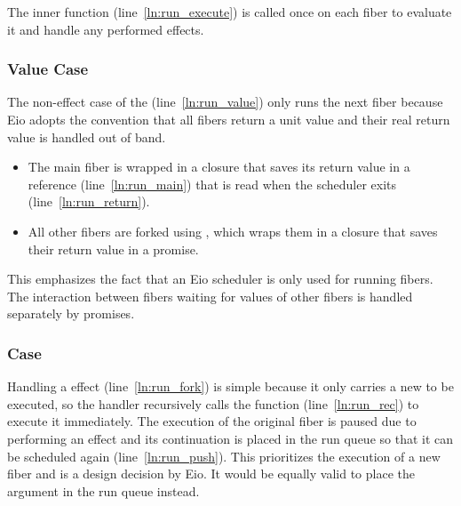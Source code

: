 The inner  function (line~\ref{ln:run_execute}) is called once on each fiber to evaluate it and handle any performed effects.
\subsubsection*{Value Case}
The non-effect case of the  (line~\ref{ln:run_value}) only runs the next fiber because Eio adopts the convention that all fibers return a unit value and their real return value is handled out of band.
\begin{itemize}
    \item The main fiber is wrapped in a closure that saves its return value in a reference (line~\ref{ln:run_main}) that is read when the scheduler exits (line~\ref{ln:run_return}).
    \item All other fibers are forked using , which wraps them in a closure that saves their return value in a promise.
\end{itemize}

This emphasizes the fact that an Eio scheduler is only used for running fibers.
The interaction between fibers waiting for values of other fibers is handled separately by promises.

\subsubsection*{\efork{} Case}
Handling a \efork{} effect (line~\ref{ln:run_fork}) is simple because it only carries a new  to be executed, so the handler recursively calls the  function (line~\ref{ln:run_rec}) to execute it immediately.
The execution of the original fiber is paused due to performing an effect and its continuation  is placed in the run queue so that it can be scheduled again (line~\ref{ln:run_push}).
This prioritizes the execution of a new fiber and is a design decision by Eio.
It would be equally valid to place the  argument in the run queue instead.

